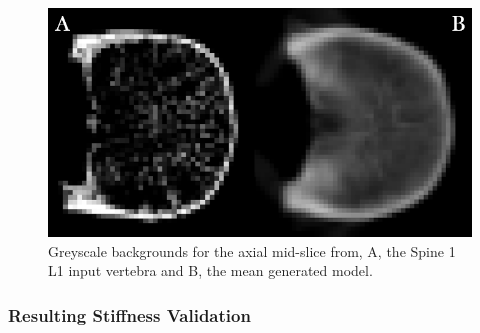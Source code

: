 \begin{figure}[h!]
  \centering
  \includegraphics[width=.6\textwidth]{Chapters/Chapter_PCA_images/INPUT_GEN_BACKGROUND.png}
	\caption{Greyscale backgrounds for the axial mid-slice from, A, the Spine 1 L1 input vertebra and B, the mean generated model.}
  \label{fig:input_gen_background}
\end{figure}
\subsubsection{Resulting Stiffness Validation}


